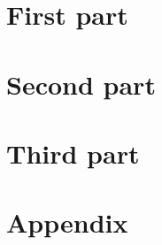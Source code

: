 \documentclass[print, final]{src/thesis}    %
\begin{document}
\part{First part}
\cleardoublepage



\cleardoublepage


\part{Second part}
\cleardoublepage



\part{Third part}
\cleardoublepage



\part{Appendix}
\cleardoublepage
\appendix



\isstarredchaptertrue   %



\cleardoublepage
{}




\ifprint{\cleardoublepage}
\else
\newpage{~}
\thispagestyle{empty}

\fi
\end{document}
